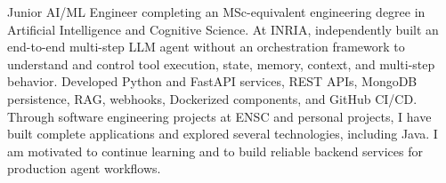 
\begin{cvparagraph}
Junior AI/ML Engineer completing an MSc-equivalent engineering degree in Artificial Intelligence and Cognitive Science. At INRIA, independently built an end-to-end multi-step LLM agent without an orchestration framework to understand and control tool execution, state, memory, context, and multi-step behavior. Developed Python and FastAPI services, REST APIs, MongoDB persistence, RAG, webhooks, Dockerized components, and GitHub CI/CD. Through software engineering projects at ENSC and personal projects, I have built complete applications and explored several technologies, including Java. I am motivated to continue learning and to build reliable backend services for production agent workflows.
\end{cvparagraph}

